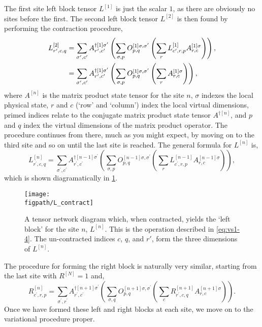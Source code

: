 The first site left block tensor \(L^{[1]}\) is just the scalar \(1\), as there are obviously no sites before the first. The second left block tensor \(L^{[2]}\) is then found by performing the contraction procedure,
\begin{align}
L^{[2]}_{r^{\prime}, c, q} &= \sum_{\sigma^{\prime}, c^{\prime}} A^{\dagger [1] \sigma^{\prime}}_{r^{\prime}, c^{\prime}} \left( \sum_{\sigma, p} O^{[1]  \sigma, \sigma^{\prime}}_{p, q} \left( \sum_{r} L^{[1]}_{c^{\prime}, r, p} A^{[1] \sigma}_{r, c} \right) \right), \notag \\
&= \sum_{\sigma^{\prime}, c^{\prime}} A^{\dagger [1] \sigma^{\prime}}_{r^{\prime}, c^{\prime}} \left( \sum_{\sigma, p} O^{[1]  \sigma, \sigma^{\prime}}_{p, q} \left( \sum_{r} A^{[1] \sigma}_{r, c} \right) \right),
\label{eq:vs1-3}
\end{align}
where \(A^{[n]}\) is the matrix product state tensor for the site \(n\), \(\sigma\) indexes the local physical state, \(r\) and \(c\) (`row' and `column') index the local virtual dimensions, primed indices relate to the conjugate matrix product state tensor \(A^{\dagger [n]}\), and \(p\) and \(q\) index the virtual dimensions of the matrix product operator. The procedure continues from there, much as you might expect, by moving on to the third site and so on until the last site is reached. The general formula for \(L^{[n]}\) is,
\begin{equation} 
L^{[n]}_{r^{\prime}, c, q} = \sum_{\sigma^{\prime}, c^{\prime}} A^{\dagger [n-1] \sigma^{\prime}}_{r^{\prime}, c^{\prime}} \left( \sum_{\sigma, p} O^{[n-1]  \sigma, \sigma^{\prime}}_{p, q} \left( \sum_{r} L^{[n-1]}_{c^{\prime}, r, p} A^{[n-1] \sigma}_{r, c} \right) \right),
\label{eq:vs1-4}
\end{equation}
which is shown diagramatically in \cref{fig:vs1-4}.

\begin{figure}[ht!]
\centering
\texttt{[image: \\figpath/L\_contract]}
\caption{A tensor network diagram which, when contracted, yields the `left block' for the site \(n\), \(L^{[n]}\). This is the operation described in \cref{eq:vs1-4}. The un-contracted indices \(c\), \(q\), and \(r'\), form the three dimensions of \(L^{[n]}\).}
\label{fig:vs1-4}
\end{figure}

The procedure for forming the right block is naturally very similar, starting from the last site with \(R^{[N]} = 1\) and,
\begin{equation}
R^{[n]}_{c^{\prime}, r, p} = \sum_{\sigma^{\prime}, r^{\prime}} A^{\dagger [n+1] \sigma^{\prime}}_{r^{\prime}, c^{\prime}} \left( \sum_{\sigma, q} O^{[n+1] \sigma, \sigma^{\prime}}_{p, q} \left( \sum_{c} R^{[n+1]}_{r^{\prime}, c, q} A^{[n+1] \sigma}_{r, c} \right) \right).  
\label{eq:vs1-5}
\end{equation}
Once we have formed these left and right blocks at each site, we move on to the variational procedure proper. 

